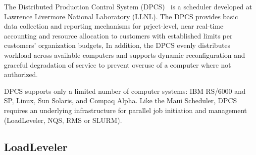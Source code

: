 The Distributed Production Control System (DPCS)~\cite{DPCS}
is a scheduler developed at Lawrence Livermore National Laboratory (LLNL).
The DPCS provides basic data collection and reporting
mechanisms for prject-level, near real-time accounting and resource allocation
to customers with established limits per customers' organization budgets,
In addition, the DPCS evenly distributes workload across available computers
and supports dynamic reconfiguration and graceful degradation of service to prevent
overuse of a computer where not authorized.

DPCS supports only a
limited number of computer systems: IBM RS/6000 and SP, Linux,
Sun Solaris, and Compaq Alpha.
Like the Maui Scheduler, DPCS requires an underlying infrastructure for
parallel job initiation and management (LoadLeveler, NQS, RMS or SLURM).

\subsection*{LoadLeveler}

